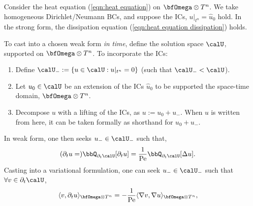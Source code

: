     \begin{example}
      Consider the heat equation (\ref{eqn:heat equation}) on $\bfOmega\otimes T^{n}$. We take homogeneous Dirichlet/Neumann BCs, and suppose the ICs, $u|_{t^{n}}  =  \widehat{u}_{0}$ hold. In the strong form, the dissipation equation (\ref{eqn:heat equation dissipation}) holds.

      To cast into a chosen weak form \emph{in time}, define the solution space $\calU$, supported on $\bfOmega\otimes T^{n}$. To incorporate the ICs:
      \begin{enumerate}
          \item  Define $\calU_{-}  :=  \{u  \in  \calU  :  u|_{t^{n}}  =  0\}$ (such that $\calU_{-}  <  \calU$).
          \item  Let $u_{0}  \in  \calU$ be an extension of the ICs $\widehat{u}_{0}$ to be supported the space-time domain, $\bfOmega\otimes T^{n}$.
          \item  Decompose $u$ with a lifting of the ICs, as $u  :=  u_{0} + u_{-}$. When $u$ is written from here, it can be taken formally as shorthand for $u_{0} + u_{-}$.
      \end{enumerate}
      In weak form, one then seeks $u_{-}  \in  \calU_{-}$ such that,
      \begin{equation}\label{eqn:heat equation weak form}
          (\partial_{t}u  =)  \bbQ_{\partial_{t}\calU}[\partial_{t}u]  =  \frac{1}{\rmPe}\bbQ_{\partial_{t}\calU}[\Delta u].
      \end{equation}
      Casting into a variational formulation, one can seek $u_{-}  \in  \calU_{-}$ such that $\forall  v  \in  \partial_{t}\calU$,
      \begin{equation}\label{eqn:heat equation variational form}
          \langle v, \partial_{t}u\rangle_{\bfOmega\otimes T^{n}}  =   - \frac{1}{\rmPe}\langle\nabla v, \nabla u\rangle_{\bfOmega\otimes T^{n}},
      \end{equation}
      

\end{example}
